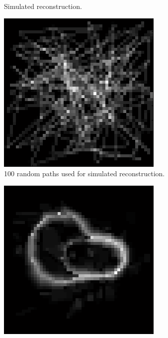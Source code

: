 \documentclass[english]{article}\usepackage[]{graphicx}\usepackage[]{color}
\begin{document}
\begin{figure}[h]
\begin{subfigure}{.22\textwidth}
  \caption{Simulated reconstruction.}
  \vspace{10pt}
  \label{fig:simulresrec}
\end{subfigure}%
\hspace{10pt}
\begin{subfigure}{.22\textwidth}
  \centering
    \includegraphics[width=1\linewidth]{figures/simulatedresultpaths}
  \caption{100 random paths used for simulated reconstruction.}
  \vspace{0pt}
  \label{fig:simulrespath}
\end{subfigure}%
\hspace {10pt}
\begin{subfigure}{.22\textwidth}
  \centering
    \includegraphics[width=1\linewidth]{figures/simulatedresulterror}

\end{subfigure}
\end{figure}
\end{document}

